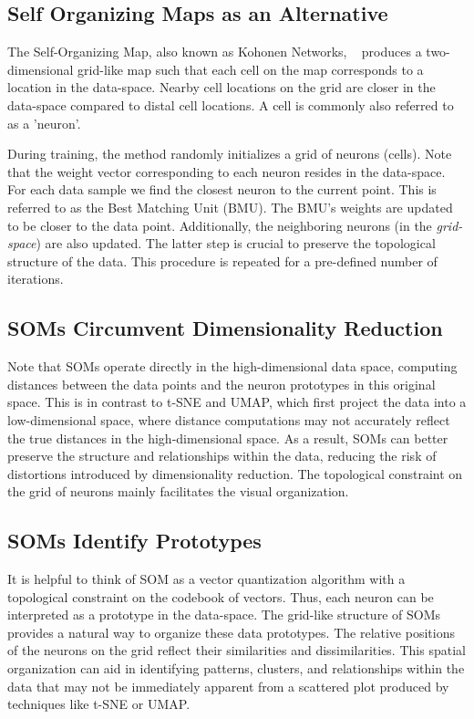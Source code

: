 \subsection*{Self Organizing Maps as an Alternative}

The Self-Organizing Map, also known as Kohonen Networks, ~\cite{kohonen1990self} produces a two-dimensional grid-like map such that each cell on the map corresponds to a location in the data-space. Nearby cell locations on the grid are closer in the data-space compared to distal cell locations. A cell is commonly also referred to as a 'neuron'.

During training, the method randomly initializes a grid of neurons (cells). Note that the weight vector corresponding to each neuron resides in the data-space. For each data sample we find the closest neuron to the current point. This is referred to as the Best Matching Unit (BMU). The BMU's weights are updated to be closer to the data point. Additionally, the neighboring neurons (in the \textit{grid-space}) are also updated. The latter step is crucial to preserve the topological structure of the data. This procedure is repeated for a pre-defined number of iterations.

\subsection*{SOMs Circumvent Dimensionality Reduction}

Note that SOMs operate directly in the high-dimensional data space, computing distances between the data points and the neuron prototypes in this original space. This is in contrast to t-SNE and UMAP, which first project the data into a low-dimensional space, where distance computations may not accurately reflect the true distances in the high-dimensional space. As a result, SOMs can better preserve the structure and relationships within the data, reducing the risk of distortions introduced by dimensionality reduction. The topological constraint on the grid of neurons mainly facilitates the visual organization. 

\subsection*{SOMs Identify Prototypes}
It is helpful to think of SOM as a vector quantization algorithm with a topological constraint on the codebook of vectors. Thus, each neuron can be interpreted as a prototype in the data-space. The grid-like structure of SOMs provides a natural way to organize these data prototypes. The relative positions of the neurons on the grid reflect their similarities and dissimilarities. This spatial organization can aid in identifying patterns, clusters, and relationships within the data that may not be immediately apparent from a scattered plot produced by techniques like t-SNE or UMAP.

